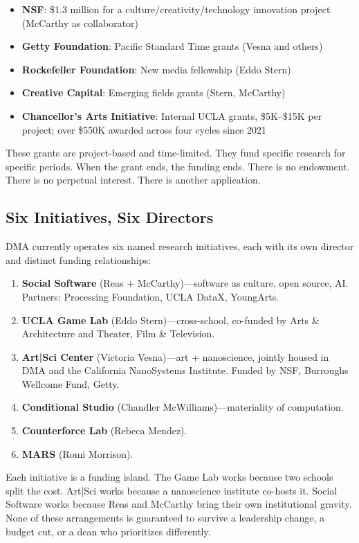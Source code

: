 \documentclass[10pt,letterpaper,twocolumn]{article}
\newcommand{\dma}{\textsc{DMA}}
\begin{document}
\begin{itemize}
  \item \textbf{NSF}: \$1.3 million for a culture/creativity/technology innovation project (McCarthy as collaborator)
  \item \textbf{Getty Foundation}: Pacific Standard Time grants (Vesna and others)
  \item \textbf{Rockefeller Foundation}: New media fellowship (Eddo Stern)
  \item \textbf{Creative Capital}: Emerging fields grants (Stern, McCarthy)
  \item \textbf{Chancellor's Arts Initiative}: Internal UCLA grants, \$5K--\$15K per project; over \$550K awarded across four cycles since 2021
\end{itemize}

These grants are project-based and time-limited. They fund specific research for specific periods. When the grant ends, the funding ends. There is no endowment. There is no perpetual interest. There is another application.

\subsection{Six Initiatives, Six Directors}

\dma{} currently operates six named research initiatives, each with its own director and distinct funding relationships:

\begin{enumerate}
  \item \textbf{Social Software} (Reas + McCarthy)---software as culture, open source, AI. Partners: Processing Foundation, UCLA DataX, YoungArts.
  \item \textbf{UCLA Game Lab} (Eddo Stern)---cross-school, co-funded by Arts \& Architecture and Theater, Film \& Television.
  \item \textbf{Art|Sci Center} (Victoria Vesna)---art + nanoscience, jointly housed in \dma{} and the California NanoSystems Institute. Funded by NSF, Burroughs Wellcome Fund, Getty.
  \item \textbf{Conditional Studio} (Chandler McWilliams)---materiality of computation.
  \item \textbf{Counterforce Lab} (Rebeca Mendez).
  \item \textbf{MARS} (Romi Morrison).
\end{enumerate}

Each initiative is a funding island. The Game Lab works because two schools split the cost. Art|Sci works because a nanoscience institute co-hosts it. Social Software works because Reas and McCarthy bring their own institutional gravity. None of these arrangements is guaranteed to survive a leadership change, a budget cut, or a dean who prioritizes differently.
\end{document}

